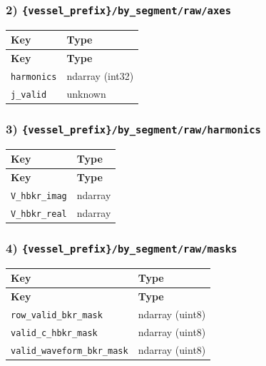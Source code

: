 \documentclass[11pt]{article}
\begin{document}
\subsubsection*{2) \texttt{\{vessel\_\allowbreak{}prefix\}/\allowbreak{}by\_\allowbreak{}segment/\allowbreak{}raw/\allowbreak{}axes}}
\begin{longtable}{|p{}|p{}|}
\hline
\textbf{Key} & \textbf{Type} \\ \hline
\endfirsthead
\hline
\textbf{Key} & \textbf{Type} \\ \hline
\endhead
\texttt{harmonics} & ndarray (int32) \\ \hline
\texttt{j\_\allowbreak{}valid} & unknown \\ \hline
\end{longtable}

\subsubsection*{3) \texttt{\{vessel\_\allowbreak{}prefix\}/\allowbreak{}by\_\allowbreak{}segment/\allowbreak{}raw/\allowbreak{}harmonics}}
\begin{longtable}{|p{}|p{}|}
\hline
\textbf{Key} & \textbf{Type} \\ \hline
\endfirsthead
\hline
\textbf{Key} & \textbf{Type} \\ \hline
\endhead
\texttt{V\_\allowbreak{}hbkr\_\allowbreak{}imag} & ndarray \\ \hline
\texttt{V\_\allowbreak{}hbkr\_\allowbreak{}real} & ndarray \\ \hline
\end{longtable}

\subsubsection*{4) \texttt{\{vessel\_\allowbreak{}prefix\}/\allowbreak{}by\_\allowbreak{}segment/\allowbreak{}raw/\allowbreak{}masks}}
\begin{longtable}{|p{}|p{}|}
\hline
\textbf{Key} & \textbf{Type} \\ \hline
\endfirsthead
\hline
\textbf{Key} & \textbf{Type} \\ \hline
\endhead
\texttt{row\_\allowbreak{}valid\_\allowbreak{}bkr\_\allowbreak{}mask} & ndarray (uint8) \\ \hline
\texttt{valid\_\allowbreak{}c\_\allowbreak{}hbkr\_\allowbreak{}mask} & ndarray (uint8) \\ \hline
\texttt{valid\_\allowbreak{}waveform\_\allowbreak{}bkr\_\allowbreak{}mask} & ndarray (uint8) \\ \hline
\end{longtable}
\end{document}
